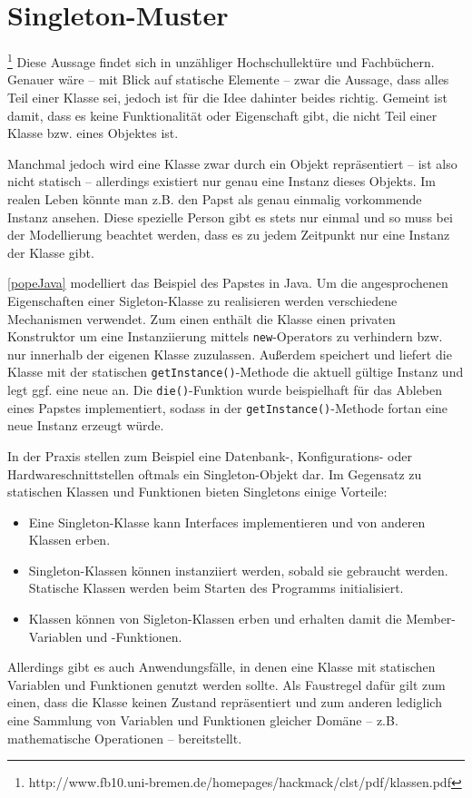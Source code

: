 \section{Singleton-Muster}
\footnote{http://www.fb10.uni-bremen.de/homepages/hackmack/clst/pdf/klassen.pdf} Diese Aussage findet sich in unzähliger Hochschullektüre und Fachbüchern. Genauer wäre -- mit Blick auf statische Elemente -- zwar die Aussage, dass alles Teil einer Klasse sei, jedoch ist für die Idee dahinter beides richtig. Gemeint ist damit, dass es keine Funktionalität oder Eigenschaft gibt, die nicht Teil einer Klasse bzw. eines Objektes ist.

Manchmal jedoch wird eine Klasse zwar durch ein Objekt repräsentiert -- ist also nicht statisch -- allerdings existiert nur genau eine Instanz dieses Objekts. Im realen Leben könnte man z.B. den Papst als genau einmalig vorkommende Instanz ansehen. Diese spezielle Person gibt es stets nur einmal und so muss bei der Modellierung beachtet werden, dass es zu jedem Zeitpunkt nur eine Instanz der Klasse gibt.


\autoref{popeJava} modelliert das Beispiel des Papstes in Java. Um die angesprochenen Eigenschaften einer Sigleton-Klasse zu realisieren werden verschiedene Mechanismen verwendet. Zum einen enthält die Klasse einen privaten Konstruktor um eine Instanziierung mittels \texttt{new}-Operators zu verhindern bzw. nur innerhalb der eigenen Klasse zuzulassen. Außerdem speichert und liefert die Klasse mit der statischen \texttt{getInstance()}-Methode die aktuell gültige Instanz und legt ggf. eine neue an. Die \texttt{die()}-Funktion wurde beispielhaft für das Ableben eines Papstes implementiert, sodass in der \texttt{getInstance()}-Methode fortan eine neue Instanz erzeugt würde.

In der Praxis stellen zum Beispiel eine Datenbank-, Konfigurations- oder Hardwareschnittstellen oftmals ein Singleton-Objekt dar. Im Gegensatz zu statischen Klassen und Funktionen bieten Singletons einige Vorteile:

\begin{itemize}
    \item Eine Singleton-Klasse kann Interfaces implementieren und von anderen Klassen erben.
    \item Singleton-Klassen können instanziiert werden, sobald sie gebraucht werden. Statische Klassen werden beim Starten des Programms initialisiert.
    \item Klassen können von Sigleton-Klassen erben und erhalten damit die Member-Variablen und -Funktionen.
\end{itemize}

Allerdings gibt es auch Anwendungsfälle, in denen eine Klasse mit statischen Variablen und Funktionen genutzt werden sollte. Als Faustregel dafür gilt zum einen, dass die Klasse keinen Zustand repräsentiert und zum anderen lediglich eine Sammlung von Variablen und Funktionen gleicher Domäne -- z.B. mathematische Operationen -- bereitstellt.